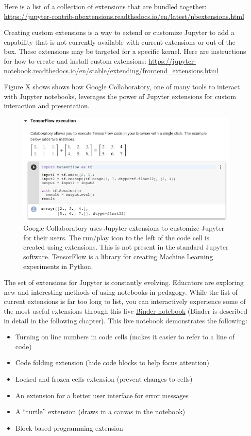 \documentclass[]{book}
\providecommand{\tightlist}{%
  \setlength{\itemsep}{0pt}\setlength{\parskip}{0pt}}
\begin{document}
Here is a list of a collection of extensions that are bundled together:
\url{https://jupyter-contrib-nbextensions.readthedocs.io/en/latest/nbextensions.html}

Creating custom extensions is a way to extend or customize Jupyter to
add a capability that is not currently available with current extensions
or out of the box. These extensions may be targeted for a specific
kernel. Here are instructions for how to create and install custom
extensions:
\url{https://jupyter-notebook.readthedocs.io/en/stable/extending/frontend_extensions.html}

Figure X shows shows how Google Collaboratory, one of many tools to
interact with Jupyter notebooks, leverages the power of Jupyter
extensions for custom interaction and presentation.

\begin{figure}
\centering
\includegraphics{images/chapter53.png}
\caption{Google Collaboratory uses Jupyter extensions to customize
Jupyter for their users. The run/play icon to the left of the code cell
is created using extensions. This is not present in the standard Jupyter
software. TensorFlow is a library for creating Machine Learning
experiments in Python.}
\end{figure}

The set of extensions for Jupyter is constantly evolving. Educators are
exploring new and interesting methods of using notebooks in pedagogy.
While the list of current extensions is far too long to list, you can
interactively experience some of the most useful extensions through this
live
\href{https://hub.mybinder.org/user/psychemedia-showntell-eii7j2nh/notebooks/index_computing.ipynb}{Binder
notebook} (Binder is described in detail in the following chapter). This
live notebook demonstrates the following:

\begin{itemize}
\tightlist
\item
  Turning on line numbers in code cells (makes it easier to refer to a
  line of code)
\item
  Code folding extension (hide code blocks to help focus attention)
\item
  Locked and frozen cells extension (prevent changes to cells)
\item
  An extension for a better user interface for error messages
\item
  A ``turtle'' extension (draws in a canvas in the notebook)
\item
  Block-based programming extension
\end{itemize}
\end{document}
